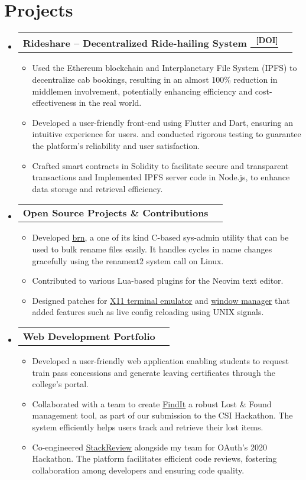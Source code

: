 \documentclass[letterpaper,11pt]{article}
\makeatletter
\newcommand{\resumeItem}[1]{
  \item\small{
    {#1 \vspace{-2pt}}
  }
}
\newcommand{\resumeProjectHeading}[2]{
    \item
    \begin{tabular*}{1.001\textwidth}{l@{\extracolsep{\fill}}r}
      \small#1 & \textbf{\small #2}\\
    \end{tabular*}\vspace{-7pt}
}
\newcommand{\resumeSubHeadingListStart}{\begin{itemize}[leftmargin=0.0in, label={}]}
\newcommand{\resumeSubHeadingListEnd}{\end{itemize}}
\newcommand{\resumeItemListStart}{\begin{itemize}}
\newcommand{\resumeItemListEnd}{\end{itemize}\vspace{-5pt}}
\makeatother
\begin{document}
\section{Projects}
\vspace{-5pt}
\resumeSubHeadingListStart
\resumeProjectHeading
{\textbf{Rideshare -- Decentralized Ride-hailing System
      {\href{https://ieeexplore.ieee.org/document/10037296}{\
          \underline{\textsuperscript{[DOI]}}}}}}{}
\resumeItemListStart
\resumeItem{Used the Ethereum blockchain and Interplanetary File
  System (IPFS) to decentralize cab bookings, resulting in an almost
  100\% reduction in middlemen involvement, potentially enhancing
  efficiency and cost-effectiveness in the real world.}
\resumeItem{Developed a user-friendly front-end using Flutter and
  Dart, ensuring an intuitive experience for users. and conducted
  rigorous testing to guarantee the platform's reliability and user
  satisfaction.}
\resumeItem{Crafted smart contracts in Solidity to facilitate
  secure and transparent transactions and Implemented IPFS server
  code in Node.js, to enhance data storage and retrieval efficiency.}
\resumeItemListEnd
\vspace{-13pt}
\resumeProjectHeading
{\textbf{Open Source Projects \& Contributions}}{}
\resumeItemListStart
\resumeItem{Developed {\href{https://www.github.com/nimaipatel/brn}{\underline{brn}}{}}, a one of its kind C-based sys-admin utility that can be used to bulk rename files easily. It handles cycles in name changes gracefully using the renameat2 system call on Linux.}
\resumeItem{Contributed to various Lua-based plugins for the Neovim text editor.}
\resumeItem{Designed patches for {\href{https://www.github.com/nimaipatel/st}{\underline{X11 terminal emulator}}} and \href{https://www.github.com/nimaipatel/dwm}{\underline{window manager}} that added features such as live config reloading using UNIX signals.}
\resumeItemListEnd
\vspace{-13pt}
\resumeProjectHeading
{\textbf{Web Development Portfolio}}{}
\resumeItemListStart
\resumeItem{Developed a user-friendly web application enabling students to request train pass concessions and generate leaving certificates through the college's portal.}
\resumeItem{Collaborated with a team to create \underline{\href{https://www.github.com/nimaipatel/findit}{FindIt}} a robust Lost \& Found management tool, as part of our submission to the CSI Hackathon. The system efficiently helps users track and retrieve their lost items.}
\resumeItem{Co-engineered \underline{\href{https://www.github.com/stack-review}{StackReview}} alongside my team for OAuth's 2020 Hackathon. The platform facilitates efficient code reviews, fostering collaboration among developers and ensuring code quality.}
\resumeItemListEnd
\vspace{-13pt}
\resumeSubHeadingListEnd
\vspace{-2pt}
\end{document}
